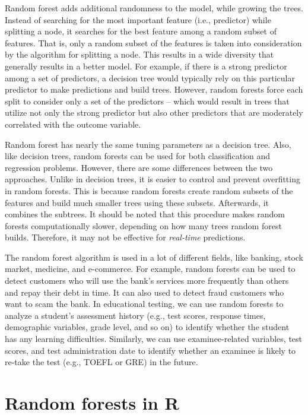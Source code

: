 \documentclass[]{book}
\begin{document}
Random forest adds additional randomness to the model, while growing the trees. Instead of searching for the most important feature (i.e., predictor) while splitting a node, it searches for the best feature among a random subset of features. That is, only a random subset of the features is taken into consideration by the algorithm for splitting a node. This results in a wide diversity that generally results in a better model. For example, if there is a strong predictor among a set of predictors, a decision tree would typically rely on this particular predictor to make predictions and build trees. However, random forests force each split to consider only a set of the predictors -- which would result in trees that utilize not only the strong predictor but also other predictors that are moderately correlated with the outcome variable.

Random forest has nearly the same tuning parameters as a decision tree. Also, like decision trees, random forests can be used for both classification and regression problems. However, there are some differences between the two approaches. Unlike in decision trees, it is easier to control and prevent overfitting in random forests. This is because random forests create random subsets of the features and build much smaller trees using these subsets. Afterwards, it combines the subtrees. It should be noted that this procedure makes random forests computationally slower, depending on how many trees random forest builds. Therefore, it may not be effective for \emph{real-time} predictions.

The random forest algorithm is used in a lot of different fields, like banking, stock market, medicine, and e-commerce. For example, random forests can be used to detect customers who will use the bank's services more frequently than others and repay their debt in time. It can also used to detect fraud customers who want to scam the bank. In educational testing, we can use random forests to analyze a student's assessment history (e.g., test scores, response times, demographic variables, grade level, and so on) to identify whether the student has any learning difficulties. Similarly, we can use examinee-related variables, test scores, and test administration date to identify whether an examinee is likely to re-take the test (e.g., TOEFL or GRE) in the future.

\hypertarget{random-forests-in-r}{%
\section{Random forests in R}\label{random-forests-in-r}}
\end{document}

